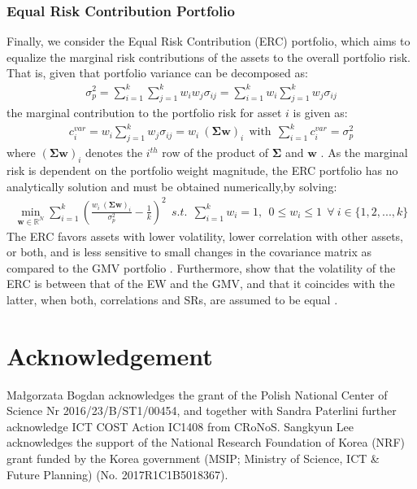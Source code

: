 \documentclass[12pt, a4paper]{article}
\newcommand{\bfw}{\boldsymbol{w} }
\newcommand{\bfSigma}{\boldsymbol{\Sigma} }
\begin{document}
\subsubsection*{Equal Risk Contribution Portfolio}\label{ERC}
%
Finally, we consider the Equal Risk Contribution (ERC) portfolio, which aims to equalize the marginal risk contributions of the assets to the overall portfolio risk. That is, given that portfolio variance can be decomposed as:
\begin{gather}
\sigma_{p}^{2} = \sum_{i=1}^{k}\sum_{j=1}^{k} w_i w_{j}\sigma_{ij}=\sum_{i=1}^{k}w_{i}\sum_{j=1}^{k}w_{j}\sigma_{ij}
\end{gather}
the marginal contribution to the portfolio risk for asset $i$ is given as:
\begin{gather}
c_{i}^{var} = w_{i}\sum_{j=1}^{k}w_{j}\sigma_{ij} = w_{i}\ (\bfSigma \bfw)_{i} \ \  \text{with} \ \  \sum_{i=1}^{k}c_{i}^{var}=\sigma_{p}^{2}
\end{gather}
where $(\bfSigma \bfw)_{i}$ denotes the $i^{th}$ row of the product of $\bfSigma$ and $\bfw$ \citep{Roncalli2013}. As the marginal risk is dependent on the portfolio weight magnitude, the ERC portfolio has no analytically solution and must be obtained numerically,by solving:
%
\begin{gather}
\min_{\bfw \in \mathbb{R}^{N}} \sum_{i=1}^{k}(\frac{w_{i}\ (\bfSigma \bfw)_{i}}{\sigma_{p}^{2}}-\frac{1}{k})^{2} \ \ 
s.t. \ \ \sum_{i=1}^{k} w_{i}=1, \ \ 0 \leq w_{i} \leq 1 \ \ \forall \ i \in \{1, 2, ..., k \}
\end{gather}
%
The ERC favors assets with lower volatility, lower correlation with other assets, or both, and is less sensitive to small changes in the covariance matrix as compared to the GMV portfolio \citep{Kremer2017}. Furthermore, \citep{Maillard2010} show that the volatility of the ERC is between that of the EW and the GMV, and that it coincides with the latter, when both, correlations and SRs, are assumed to be equal \citep{Maillard2010}.




\section*{Acknowledgement}
Ma\l{}gorzata Bogdan acknowledges the grant of the Polish National Center of Science Nr 2016/23/B/ST1/00454, and together with Sandra Paterlini further acknowledge ICT COST Action IC1408 from CRoNoS. Sangkyun Lee acknowledges the support of the National Research Foundation of Korea (NRF) grant funded by the Korea government (MSIP; Ministry of Science, ICT \& Future Planning) (No. 2017R1C1B5018367).




\end{document}
